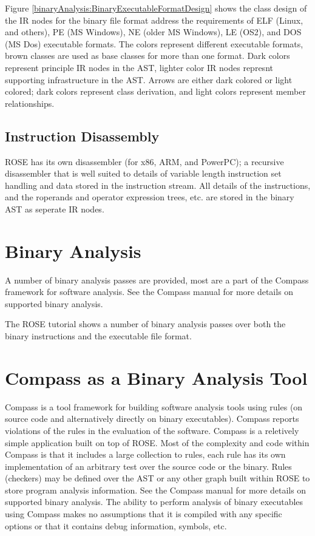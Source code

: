 Figure \ref{binaryAnalysis:BinaryExecutableFormatDesign} shows the class design of the IR
nodes for the binary file format address the
requirements of ELF (Linux, and others), PE (MS Windows), NE (older MS Windows), 
LE (OS\/2), and DOS (MS Dos) executable formats.  The colors represent different
executable formats, brown classes are used as base classes for more than one
format. Dark colors represent principle IR nodes in the AST, lighter color IR nodes
represnt supporting infrastructure in the AST.  Arrows are either dark colored or
light colored; dark colors represent class derivation, and light colors represent
member relationships.

\subsection{Instruction Disassembly}

    ROSE has its own disassembler (for x86, ARM, and PowerPC); a recursive disassembler that is well suited to
details of variable length instruction set handling and data stored in the instruction
stream.  All details of the instructions, and the roperands and operator expression trees,
etc. are stored in the binary AST as seperate IR nodes.

\section{Binary Analysis}

   A number of binary analysis passes are provided, most are a part of the Compass
framework for software analysis.  See the Compass manual for more details on supported
binary analysis.

   The ROSE tutorial shows a number of binary analysis passes over both the binary
instructions and the executable file format.

\section{Compass as a Binary Analysis Tool}

   Compass is a tool framework for building software analysis tools using rules (on source
code and alternatively directly on binary executables). Compass
reports violations of the rules in the evaluation of the software.  Compass is a
reletively simple application built on top of ROSE.  Most of the complexity and code 
within Compass is that it includes a large collection to rules, each rule has its
own implementation of an arbitrary test over the source code or the binary.  Rules
(checkers) may be defined over the AST or any other graph built within ROSE to store 
program analysis information. See the Compass manual for more details on supported
binary analysis.  The ability to perform analysis of binary executables using Compass 
makes no assumptions that it is compiled with any specific options or that it contains
debug information, symbols, etc.


